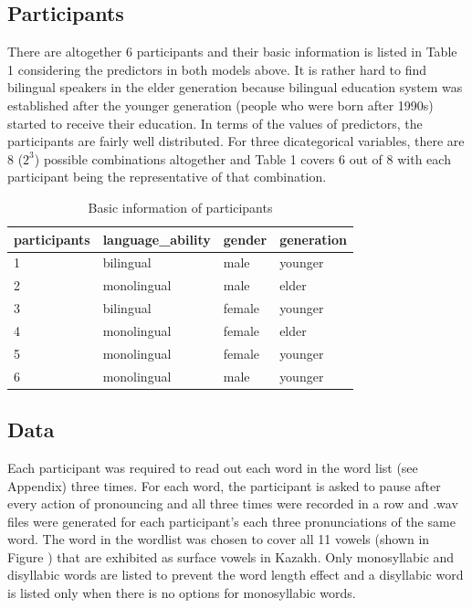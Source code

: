 \documentclass[
  man,floatsintext]{apa6}
\begin{document}
\subsection{Participants}\label{participants}

There are altogether 6 participants and their basic information is listed in Table 1 considering the predictors in both models above. It is rather hard to find bilingual speakers in the elder generation because bilingual education system was established after the younger generation (people who were born after 1990s) started to receive their education. In terms of the values of predictors, the participants are fairly well distributed. For three dicategorical variables, there are \(8\) (\(2^3\)) possible combinations altogether and Table 1 covers 6 out of 8 with each participant being the representative of that combination.

\begin{table}[H]

\begin{center}
\begin{threeparttable}

\caption{\label{tab:table1}Basic information of participants}

\begin{tabular}{llll}
\toprule
participants & \multicolumn{1}{c}{language\_ability} & \multicolumn{1}{c}{gender} & \multicolumn{1}{c}{generation}\\
\midrule
1 & bilingual & male & younger\\
2 & monolingual & male & elder\\
3 & bilingual & female & younger\\
4 & monolingual & female & elder\\
5 & monolingual & female & younger\\
6 & monolingual & male & younger\\
\bottomrule
\end{tabular}

\end{threeparttable}
\end{center}

\end{table}

\subsection{Data}\label{data}

Each participant was required to read out each word in the word list (see Appendix) three times. For each word, the participant is asked to pause after every action of pronouncing and all three times were recorded in a row and .wav files were generated for each participant's each three pronunciations of the same word. The word in the wordlist was chosen to cover all 11 vowels (shown in Figure ) that are exhibited as surface vowels in Kazakh. Only monosyllabic and disyllabic words are listed to prevent the word length effect and a disyllabic word is listed only when there is no options for monosyllabic words.
\end{document}
